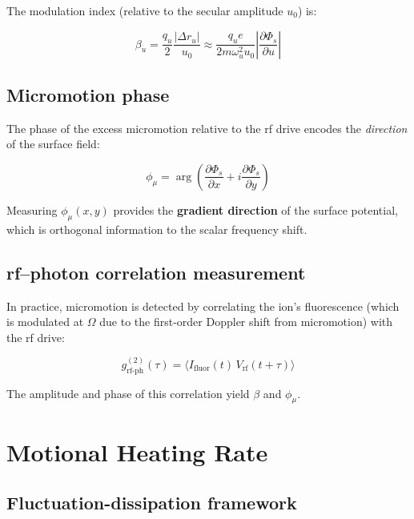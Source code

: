 \documentclass[11pt,a4paper]{article}
\begin{document}
The modulation index (relative to the secular amplitude $u_0$) is:

\begin{equation}
\beta_u = \frac{q_u}{2}\frac{|\Delta r_u|}{u_0}
         \approx \frac{q_u e}{2m\omega_u^2 u_0}\left|\frac{\partial\Phi_s}{\partial u}\right|
\label{eq:modulation_index}
\end{equation}

\subsection{Micromotion phase}

The phase of the excess micromotion relative to the rf drive encodes the
\emph{direction} of the surface field:

\begin{equation}
\phi_\mu = \arg\left(\frac{\partial\Phi_s}{\partial x} + i\frac{\partial\Phi_s}{\partial y}\right)
\label{eq:micromotion_phase}
\end{equation}

Measuring $\phi_\mu(x,y)$ provides the \textbf{gradient direction} of the surface
potential, which is orthogonal information to the scalar frequency shift.

\subsection{rf–photon correlation measurement}

In practice, micromotion is detected by correlating the ion's fluorescence
(which is modulated at $\Omega$ due to the first-order Doppler shift from
micromotion) with the rf drive:

\begin{equation}
g^{(2)}_{\text{rf-ph}}(\tau) = \langle I_{\text{fluor}}(t)\,V_{\text{rf}}(t+\tau)\rangle
\label{eq:rf_photon_correlation}
\end{equation}

The amplitude and phase of this correlation yield $\beta$ and $\phi_\mu$.

\section{Motional Heating Rate}

\subsection{Fluctuation-dissipation framework}
\end{document}
